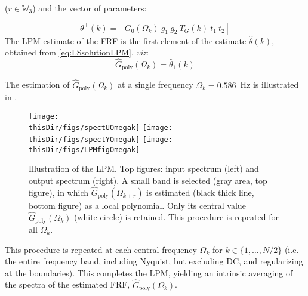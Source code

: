 \noindent
($r\in\mathbb{W}_3$)
and the vector of parameters:

\begin{equation}\label{lpmThetaEst}
\theta^\top(k)=\left[G_0(\Omega_k) \ g_1 \ g_2\  T_G(k)\  t_1 \ t_2\right]
\end{equation}
The \gls{LPM} estimate of the FRF is the first element of the estimate $\hat\theta(k)$, obtained from \eqref{eq:LSsolutionLPM}, \emph{viz}:
\begin{equation}
\hat{G}_\text{poly}(\Omega_k) = \hat\theta_1(k)
\end{equation}


The estimation of $\hat{G}_\text{poly}(\Omega_k)$ at a single frequency $\Omega_k = 0.586$~Hz is illustrated in .%
\begin{figure}[htb] %
   \centering
   \texttt{[image: \\thisDir/figs/spectUOmegak]} 
   \texttt{[image: \\thisDir/figs/spectYOmegak]} 
   \texttt{[image: \\thisDir/figs/LPMfigOmegak]} 
   \caption{Illustration of the \gls{LPM}. Top figures: input spectrum (left) and output spectrum (right). A small band is selected (gray area, top figure), in which $\hat G_\mathrm{poly}(\Omega_{k+r})$ is estimated (black thick line, bottom figure) as a local polynomial. Only its central value $\hat G_\mathrm{poly}(\Omega_k)$ (white circle) is retained. This procedure is repeated for all $\Omega_k$.}
   \label{LPM_Schematic_EG}
\end{figure}
This procedure is repeated at each central frequency $\Omega_k$ for  $k\in \{1,\dots,N/2\}$ (i.e. the entire frequency band, including Nyquist, but excluding DC, and regularizing at the boundaries). This completes the \gls{LPM}, yielding an intrinsic averaging of the spectra of the estimated \gls{FRF}, $\hat{G}_\text{poly}(\Omega_k)$.

